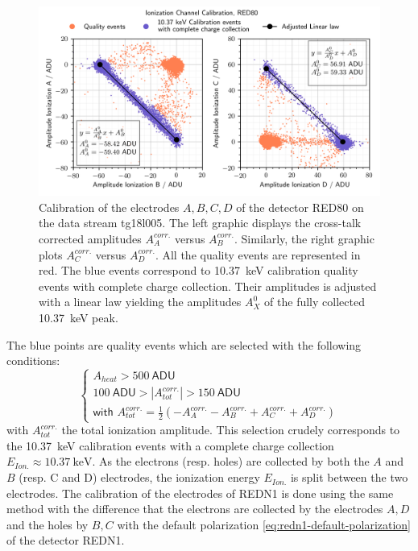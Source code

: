 \begin{figure}
\centering
\includegraphics[scale=1]{Figures/ElectrodesExperimental/ion_calibration.png}
\caption{Calibration of the electrodes $A,B,C,D$ of the detector RED80 on the data stream tg18l005. The left graphic displays the cross-talk corrected amplitudes $A_A^{corr.}$ versus $A_B^{corr.}$. Similarly, the right graphic plots $A_C^{corr.}$ versus $A_D^{corr.}$. All the quality events are represented in red. The blue events correspond to \SI{10.37}{\kilo\eV} calibration quality events with complete charge collection. Their amplitudes is adjusted with a linear law yielding the amplitudes $A_X^0$ of the fully collected \SI{10.37}{\kilo\eV} peak.}
\label{fig:ion-calibration}
\end{figure}

The blue points are quality events which are selected with the following conditions:
\begin{equation}
\begin{cases}
A_{heat} > \SI{500}{\textsf{ADU}} \\
\SI{100}{\textsf{ADU}} > |A_{tot}^{corr.}| > \SI{150}{\textsf{ADU}} \\
\textsf{with  } A_{tot}^{corr.} = \frac{1}{2} \left( -A_A^{corr.}-A_B^{corr.}+A_C^{corr.}+A_D^{corr.} \right)
\end{cases}
\end{equation}
with $A_{tot}^{corr.}$ the total ionization amplitude. This selection crudely corresponds to the \SI{10.37}{\kilo\eV} calibration events with a complete charge collection $E_{Ion.} \approx \SI{10.37}{\kilo\eV}$. As the electrons (resp. holes) are collected by both the $A$ and $B$ (resp. C and D) electrodes, the ionization energy $E_{Ion.}$ is split between the two electrodes. The calibration of the electrodes of REDN1 is done using the same method with the difference that the electrons are collected by the electrodes $A,D$ and the holes by $B,C$ with the default polarization \ref{eq:redn1-default-polarization} of the detector REDN1.

